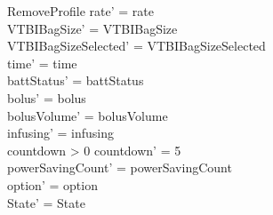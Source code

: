 \begin{schema}{RemoveProfile}
	rate' = rate\\
	VTBIBagSize' = VTBIBagSize\\ 
	VTBIBagSizeSelected' = VTBIBagSizeSelected\\
	time' = time\\
	battStatus' = battStatus\\
	bolus' = bolus\\
	bolusVolume' = bolusVolume\\
	infusing' = infusing\\
	countdown > 0 \land countdown' = 5\\
	powerSavingCount' = powerSavingCount\\ 
	option' = option\\
	State' = State\\
\end{schema}

